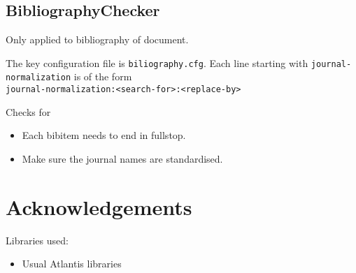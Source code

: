 \documentclass[11pt]{article}
\begin{document}
    \subsection{BibliographyChecker}
    
    Only applied to bibliography of document.
    
    The key configuration file is \verb+biliography.cfg+. Each line starting with \verb+journal-normalization+ is of the form\\
    \verb+journal-normalization:<search-for>:<replace-by>+
    
    Checks for 
    \begin{itemize}
        \itemsep-1mm
        \item Each bibitem needs to end in fullstop.
        \item Make sure the journal names are standardised.
    \end{itemize}
    
    
    
    
    
    \section{Acknowledgements}
    
    Libraries used:
    \begin{itemize}
        \item Usual Atlantis libraries
    \end{itemize}
    
    
\end{document}
